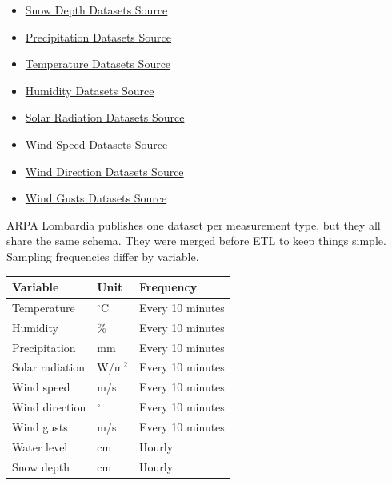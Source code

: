 \documentclass{article}
\begin{document}
	\begin{itemize}
		\item \href{https://www.dati.Lombardia.it/Ambiente/Altezza-neve-dal-2021/uqbu-tt6m/about_data}{Snow Depth Datasets Source}
		\item \href{https://www.dati.Lombardia.it/Ambiente/Precipitazioni-dal-2021/pstb-pga6/about_data}{Precipitation Datasets Source}
		\item \href{https://www.dati.Lombardia.it/Ambiente/Temperatura-dal-2021/w9wd-u6jh/about_data}{Temperature Datasets Source}
		\item \href{https://www.dati.Lombardia.it/Ambiente/Umidit-relativa-dal-2021/823w-fh4c/about_data}{Humidity Datasets Source}
		\item \href{https://www.dati.Lombardia.it/Ambiente/Radiazione-Globale-dal-2021/cxym-eps2/about_data}{Solar Radiation Datasets Source}
		\item \href{https://www.dati.Lombardia.it/Ambiente/Velocit-del-vento-dal-2021/hu5q-68e3/about_data}{Wind Speed Datasets Source}
		\item \href{https://www.dati.Lombardia.it/Ambiente/Direzione-del-vento-dal-2021/purm-rsjf/about_data}{Wind Direction Datasets Source}
		\item \href{https://www.dati.Lombardia.it/Ambiente/Raffica-del-vento-dal-2021/gi9u-2aez/about_data}{Wind Gusts Datasets Source}
	\end{itemize}
	

	ARPA Lombardia publishes one dataset per measurement type, but they all share the same schema. They were merged before ETL to keep things simple. Sampling frequencies differ by variable.
	
	\begin{table}[H]
		\centering
		\begin{tabular}{lll}
			\hline
			Variable & Unit & Frequency \\
			\hline
			Temperature & $^\circ$C & Every 10 minutes \\
			Humidity & \% & Every 10 minutes \\
			Precipitation & mm & Every 10 minutes \\
			Solar radiation & W/m$^2$ & Every 10 minutes \\
			Wind speed & m/s & Every 10 minutes \\
			Wind direction & $^\circ$ & Every 10 minutes \\
			Wind gusts & m/s & Every 10 minutes \\
			Water level & cm & Hourly \\
			Snow depth & cm & Hourly \\
			\hline
		\end{tabular}
	\end{table}
	
\end{document}
